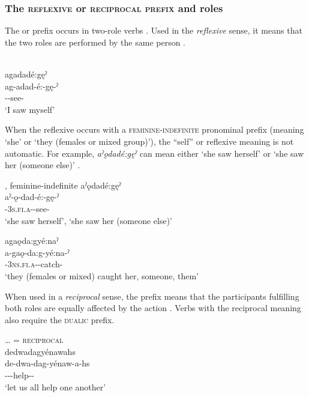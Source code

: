 \subsubsection*{The \textsc{reflexive} or \textsc{reciprocal prefix} and roles} \label{The reflexive or reciprocal prefix and roles}
The  \textsc{} or \textsc{\reciprocal} prefix  occurs in two-role verbs . Used in the \emph{reflexive} sense, it means that the two roles are performed by the same person . 

\ea\label{ex:reflex100}  \textsc{}\\
agadadé:gęˀ\\
\gll ag-adad-é:-gę-ˀ\\
-{\joinerE}-see-{\punctual}\\
\glt ‘I saw myself’
\z


When the reflexive occurs with a \textsc{feminine-indefinite} pronominal prefix (meaning ‘she’ or ‘they (females or mixed group)’), the “self” or reflexive meaning is not automatic. For example, \textit{aˀǫdadé:gęˀ} can mean either ‘she saw herself’ or ‘she saw her (someone else)’ .

\newpage
\ea\label{ex:reflex200}  \textsc{}, feminine-indefinite
\ea aˀǫdadé:gęˀ\\
\gll aˀ-ǫ-dad-é:-gę-ˀ\\
{\factual}-\textsc{3s.fi.a}-{}-see-{\punctual}\\
\glt ‘she saw herself’, ‘she saw her (someone else)’

\ex agaǫda:gyé:naˀ\\
\gll a-gaǫ-da:g-yé:na-ˀ\\
{\factual}-\textsc{3ns.fi.a}-{}-catch-{\punctual}\\
\glt ‘they (females or mixed) caught her, someone, them’
\z
\z

When used in a \emph{reciprocal} sense, the  prefix means that the participants fulfilling both roles are equally affected by the action . Verbs with the reciprocal meaning also require the  \textsc{dualic} prefix.

\ea\label{ex:reflex300}  \textsc{\dualic…} = \textsc{reciprocal}\\
dedwadagyénawahs\\
\gll de-dwa-dag-yénaw-a-hs\\
{\dualic}--{}-help-{\joinerA}-{\habitual}\\
\glt ‘let us all help one another’
\z


